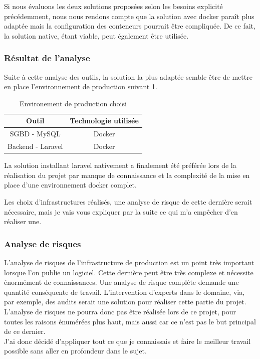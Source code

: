 \documentclass[
    iai, %
    il, %
]{heig-tb}
\begin{document}
Si nous évaluons les deux solutions proposées selon les besoins explicité précédemment, nous nous rendons compte que la solution avec \Gls{docker} paraît plus adaptée mais la configuration des \Gls{conteneur}s pourrait être compliquée. De ce fait, la solution native, étant viable, peut également être utilisée.

\subsubsection{Résultat de l'analyse}
Suite à cette analyse des outils, la solution la plus adaptée semble être de mettre en place
l'environnement de production suivant \ref{env-prod}.

\begin{table}[h]
    \begin{center}
        \caption{Environement de production choisi \label{env-prod}}
        \begin{tabular}{c|c}
            Outil             & Technologie utilisée \\ \hline
            SGBD - MySQL      & Docker               \\
            Backend - Laravel & Docker               \\
        \end{tabular}
    \end{center}
\end{table}

La solution installant \Gls{laravel} nativement a finalement été préférée lors de la réalisation du projet par manque de connaissance et la complexité de la mise en place d'une environnement \Gls{docker} complet.

Les choix d'infrastructures réalisés, une analyse de risque de cette dernière serait nécessaire, mais je vais vous expliquer par la suite ce qui m'a empêcher d'en réaliser une.

\subsubsection{Analyse de risques}
L'analyse de risques de l'infrastructure de production est un point très important lorsque l'on publie un logiciel. Cette dernière peut être très complexe et nécessite énormément de connaissances.
Une analyse de risque complète demande une quantité conséquente de travail. L'intervention d'experts dans le domaine, via, par exemple, des audits serait une solution pour réaliser cette partie du projet.\\
L'analyse de risques ne pourra donc pas être réalisée lors de ce projet, pour toutes les raisons énumérées plus haut, mais aussi car ce n'est pas le but principal de ce dernier.\\
J'ai donc décidé d'appliquer tout ce que je connaissais et faire le meilleur travail possible sans aller en profondeur dans le sujet.
\end{document}
